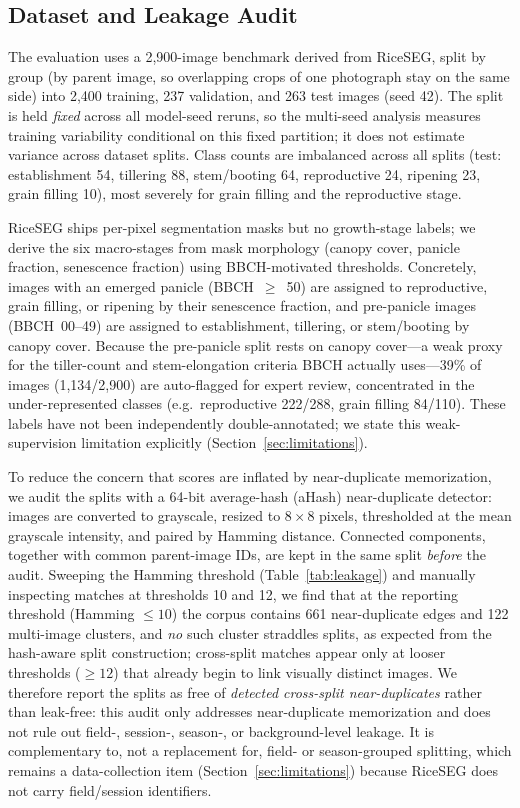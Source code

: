 \documentclass{llncs}
\begin{document}
\subsection{Dataset and Leakage Audit}

The evaluation uses a 2{,}900-image benchmark derived from RiceSEG, split by group (by parent image, so overlapping crops of one photograph stay on the same side) into 2{,}400 training, 237 validation, and 263 test images (seed 42). The split is held \emph{fixed} across all model-seed reruns, so the multi-seed analysis measures training variability conditional on this fixed partition; it does not estimate variance across dataset splits. Class counts are imbalanced across all splits (test: establishment 54, tillering 88, stem/booting 64, reproductive 24, ripening 23, grain filling 10), most severely for grain filling and the reproductive stage.

RiceSEG ships per-pixel segmentation masks but no growth-stage labels; we derive the six macro-stages from mask morphology (canopy cover, panicle fraction, senescence fraction) using BBCH-motivated thresholds. Concretely, images with an emerged panicle (BBCH~$\ge$~50) are assigned to reproductive, grain filling, or ripening by their senescence fraction, and pre-panicle images (BBCH~00--49) are assigned to establishment, tillering, or stem/booting by canopy cover. Because the pre-panicle split rests on canopy cover---a weak proxy for the tiller-count and stem-elongation criteria BBCH actually uses---39\% of images (1{,}134/2{,}900) are auto-flagged for expert review, concentrated in the under-represented classes (e.g.\ reproductive 222/288, grain filling 84/110). These labels have not been independently double-annotated; we state this weak-supervision limitation explicitly (Section~\ref{sec:limitations}).

To reduce the concern that scores are inflated by near-duplicate memorization, we audit the splits with a 64-bit average-hash (aHash) near-duplicate detector: images are converted to grayscale, resized to $8\times8$ pixels, thresholded at the mean grayscale intensity, and paired by Hamming distance. Connected components, together with common parent-image IDs, are kept in the same split \emph{before} the audit. Sweeping the Hamming threshold (Table~\ref{tab:leakage}) and manually inspecting matches at thresholds 10 and 12, we find that at the reporting threshold (Hamming $\le 10$) the corpus contains 661 near-duplicate edges and 122 multi-image clusters, and \emph{no} such cluster straddles splits, as expected from the hash-aware split construction; cross-split matches appear only at looser thresholds ($\ge 12$) that already begin to link visually distinct images. We therefore report the splits as free of \emph{detected cross-split near-duplicates} rather than leak-free: this audit only addresses near-duplicate memorization and does not rule out field-, session-, season-, or background-level leakage. It is complementary to, not a replacement for, field- or season-grouped splitting, which remains a data-collection item (Section~\ref{sec:limitations}) because RiceSEG does not carry field/session identifiers.
\end{document}
